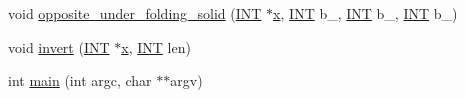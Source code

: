 \begin{DoxyCompactItemize}
\item 
void \mbox{\hyperlink{hamming_8_c_a362251ba8decbf55f4d6cddcde116c7a}{opposite\+\_\+under\+\_\+folding\+\_\+solid}} (\mbox{\hyperlink{galois_8h_a09fddde158a3a20bd2dcadb609de11dc}{I\+NT}} $\ast$\mbox{\hyperlink{alphabet2_8_c_a6150e0515f7202e2fb518f7206ed97dc}{x}}, \mbox{\hyperlink{galois_8h_a09fddde158a3a20bd2dcadb609de11dc}{I\+NT}} b\+\_, \mbox{\hyperlink{galois_8h_a09fddde158a3a20bd2dcadb609de11dc}{I\+NT}} b\+\_, \mbox{\hyperlink{galois_8h_a09fddde158a3a20bd2dcadb609de11dc}{I\+NT}} b\+\_)
\item 
void \mbox{\hyperlink{hamming_8_c_a62e41f114dbb38cabcfe808800b75839}{invert}} (\mbox{\hyperlink{galois_8h_a09fddde158a3a20bd2dcadb609de11dc}{I\+NT}} $\ast$\mbox{\hyperlink{alphabet2_8_c_a6150e0515f7202e2fb518f7206ed97dc}{x}}, \mbox{\hyperlink{galois_8h_a09fddde158a3a20bd2dcadb609de11dc}{I\+NT}} len)
\item 
int \mbox{\hyperlink{hamming_8_c_a3c04138a5bfe5d72780bb7e82a18e627}{main}} (int argc, char $\ast$$\ast$argv)
\end{DoxyCompactItemize}
